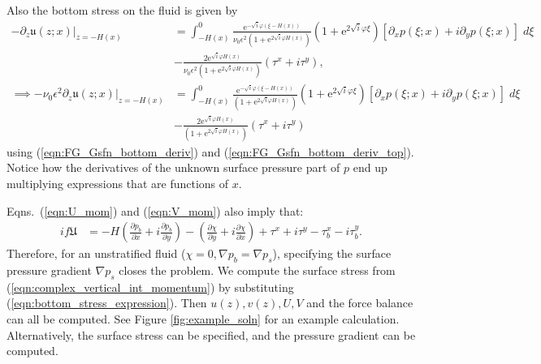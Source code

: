 \documentclass[10pt]{amsart}
\begin{document}
Also the bottom stress on the fluid is given by
\begin{align}
-\partial_z \left. \mathfrak{u} (z;x) \right|_{z = -H(x)} & =  \int_{-H(x)}^{0} 
 \frac{ \mathrm{e}^{-\sqrt{i} \varphi (\xi - H(x))  } }{ \nu_0 \epsilon^2 \left(1 + \mathrm{e}^{2 \sqrt{i} \varphi H \left(x \right)} \right)}
\left( 1 + \mathrm{e}^{2 \sqrt{i} \varphi \xi}\right) 
 \left[ \partial_x p( \xi; x) + i \partial_y p( \xi; x) \right] \; d \xi \nonumber \\
& - \frac{ 2 \mathrm{e}^{\sqrt{i} \varphi H(x)  } }{ \nu_0 \epsilon^2 \left(1 + \mathrm{e}^{2 \sqrt{i} \varphi H \left(x \right)} \right)}
\left( \tau^x + i \tau^y \right) , \nonumber \\
\implies - \nu_0 \epsilon^2 \partial_z \left. \mathfrak{u} (z;x) \right|_{z = -H(x)} & = \int_{-H(x)}^{0} 
\frac{ \mathrm{e}^{-\sqrt{i} \varphi (\xi - H(x))  } }{ \left(1 + \mathrm{e}^{2 \sqrt{i} \varphi H \left(x \right)} \right)}
\left( 1 + \mathrm{e}^{2 \sqrt{i} \varphi \xi}\right) 
 \left[ \partial_x p( \xi; x) + i \partial_y p( \xi; x) \right] \; d \xi \nonumber \\
&-\frac{ 2 \mathrm{e}^{\sqrt{i} \varphi H(x)  } }{ \left(1 + \mathrm{e}^{2 \sqrt{i} \varphi H \left(x \right)} \right)}
 \left( \tau^x + i \tau^y \right)
 \label{eqn:bottom_stress_expression}
 \end{align}
using (\ref{eqn:FG_Gsfn_bottom_deriv}) and (\ref{eqn:FG_Gsfn_bottom_deriv_top}).
Notice how the derivatives of the unknown surface pressure part of $p$ end up multiplying expressions that are functions of $x$.

Eqns.~(\ref{eqn:U_mom}) and (\ref{eqn:V_mom}) also imply that:
\begin{align}
i f \mathfrak{U} & = - H \left(\frac{\partial p_b}{\partial x} + i \frac{\partial p_b}{\partial y} \right) - \left(\frac{\partial \chi }{\partial y} + i \frac{\partial \chi}{\partial x}  \right)  + \tau^x + i \tau^y  - \tau^x_b - i \tau^y_b .
\label{eqn:complex_vertical_int_momentum}
\end{align}
Therefore, for an unstratified fluid ($\chi = 0, \nabla p_b = \nabla p_s$), specifying the surface pressure gradient $\nabla p_s$ closes the problem. 
We compute the surface stress from (\ref{eqn:complex_vertical_int_momentum}) by substituting (\ref{eqn:bottom_stress_expression}).
Then $u(z), v(z), U, V$ and the force balance can all be computed. 
See Figure \ref{fig:example_soln} for an example calculation.
Alternatively, the surface stress can be specified, and the pressure gradient can be computed.
\end{document}
